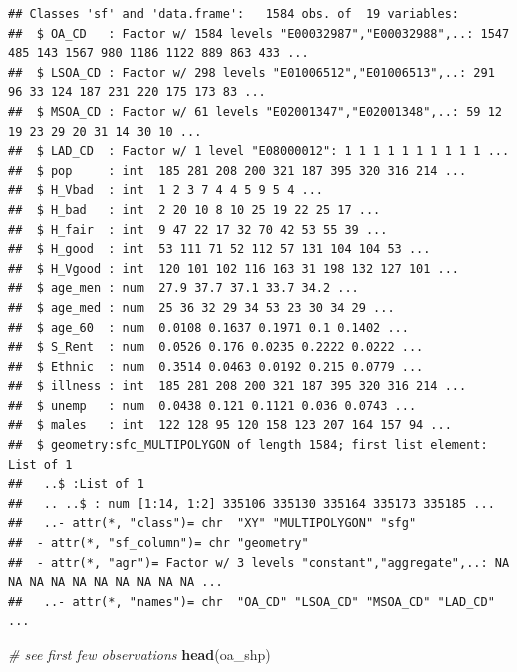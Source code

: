 \documentclass[]{book}
\newenvironment{Shaded}{\begin{snugshade}}{\end{snugshade}}
\newcommand{\KeywordTok}[1]{\textcolor[rgb]{0.13,0.29,0.53}{\textbf{#1}}}
\newcommand{\CommentTok}[1]{\textcolor[rgb]{0.56,0.35,0.01}{\textit{#1}}}
\newcommand{\NormalTok}[1]{#1}
\begin{document}
\begin{verbatim}
## Classes 'sf' and 'data.frame':   1584 obs. of  19 variables:
##  $ OA_CD   : Factor w/ 1584 levels "E00032987","E00032988",..: 1547 485 143 1567 980 1186 1122 889 863 433 ...
##  $ LSOA_CD : Factor w/ 298 levels "E01006512","E01006513",..: 291 96 33 124 187 231 220 175 173 83 ...
##  $ MSOA_CD : Factor w/ 61 levels "E02001347","E02001348",..: 59 12 19 23 29 20 31 14 30 10 ...
##  $ LAD_CD  : Factor w/ 1 level "E08000012": 1 1 1 1 1 1 1 1 1 1 ...
##  $ pop     : int  185 281 208 200 321 187 395 320 316 214 ...
##  $ H_Vbad  : int  1 2 3 7 4 4 5 9 5 4 ...
##  $ H_bad   : int  2 20 10 8 10 25 19 22 25 17 ...
##  $ H_fair  : int  9 47 22 17 32 70 42 53 55 39 ...
##  $ H_good  : int  53 111 71 52 112 57 131 104 104 53 ...
##  $ H_Vgood : int  120 101 102 116 163 31 198 132 127 101 ...
##  $ age_men : num  27.9 37.7 37.1 33.7 34.2 ...
##  $ age_med : num  25 36 32 29 34 53 23 30 34 29 ...
##  $ age_60  : num  0.0108 0.1637 0.1971 0.1 0.1402 ...
##  $ S_Rent  : num  0.0526 0.176 0.0235 0.2222 0.0222 ...
##  $ Ethnic  : num  0.3514 0.0463 0.0192 0.215 0.0779 ...
##  $ illness : int  185 281 208 200 321 187 395 320 316 214 ...
##  $ unemp   : num  0.0438 0.121 0.1121 0.036 0.0743 ...
##  $ males   : int  122 128 95 120 158 123 207 164 157 94 ...
##  $ geometry:sfc_MULTIPOLYGON of length 1584; first list element: List of 1
##   ..$ :List of 1
##   .. ..$ : num [1:14, 1:2] 335106 335130 335164 335173 335185 ...
##   ..- attr(*, "class")= chr  "XY" "MULTIPOLYGON" "sfg"
##  - attr(*, "sf_column")= chr "geometry"
##  - attr(*, "agr")= Factor w/ 3 levels "constant","aggregate",..: NA NA NA NA NA NA NA NA NA NA ...
##   ..- attr(*, "names")= chr  "OA_CD" "LSOA_CD" "MSOA_CD" "LAD_CD" ...
\end{verbatim}

\begin{Shaded}
\begin{Highlighting}[]
\CommentTok{# see first few observations}
\KeywordTok{head}\NormalTok{(oa_shp)}
\end{Highlighting}
\end{Shaded}
\end{document}
